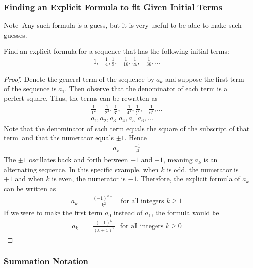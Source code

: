 \subsubsection{Finding an Explicit Formula to fit Given Initial Terms}
Note: Any such formula is a guess, but it is very useful to be able to make such guesses.
\begin{problem}
    Find an explicit formula for a sequence that has the following initial terms:
    \begin{align*}
        1, - \frac{1}{4}, \frac{1}{9}, - \frac{1}{16}, \frac{1}{25}, - \frac{1}{36}, \ldots
    \end{align*}
\end{problem}
\begin{proof}
    Denote the general term of the sequence by $a_k$ and suppose the first term of the sequence is $a_1$. Then observe that the denominator of each term is a perfect square. Thus, the terms can be rewritten as
    \begin{align*}
        \frac{1}{1^2}, - \frac{1}{2^2}, \frac{1}{3^2}, - \frac{1}{4^2}, \frac{1}{5^2}, - \frac{1}{6^2}, \ldots \\
        a_1, a_2, a_3, a_4, a_5, a_6, \ldots
    \end{align*}
    Note that the denominator of each term equals the square of the subscript of that term, and that the numerator equals $\pm 1$. Hence
    \begin{align*}
        a_k &= \frac{\pm 1}{k^2}
    \end{align*}
    The $\pm 1$ oscillates back and forth between $+1$ and $-1$, meaning $a_k$ is an alternating sequence. In this specific example, when $k$ is odd, the numerator is $+1$ and when $k$ is even, the numerator is $-1$. Therefore, the explicit formula of $a_k$ can be written as
    \begin{align*}
        a_k &= \frac{(-1)^{k+1}}{k^2} & \text{for all integers $k \geq 1$}
    \end{align*}
    If we were to make the first term $a_0$ instead of $a_1$, the formula would be
    \begin{align*}
        a_k &= \frac{(-1)^k}{(k+1)^2} & \text{for all integers $k \geq 0$}
    \end{align*}
\end{proof}

\subsubsection{Summation Notation}

